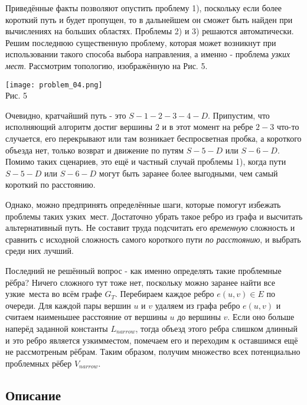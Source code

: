 \documentclass[12pt]{article}
\begin{document}
Приведённые факты позволяют опустить проблему 1), поскольку если более короткий путь и будет пропущен, то в дальнейшем он сможет быть найден при вычислениях на больших областях. Проблемы 2) и 3) решаются автоматически. Решим последнюю существенную проблему, которая может возникнут при использовании такого способа выбора направления, а именно - проблема \textit{узких мест}. Рассмотрим топологию, изображённую на Рис. 5.

\begin{center}
\texttt{[image: problem\_04.png]} \\
    Рис. 5
\end{center}

Очевидно, кратчайший путь - это $S-1-2-3-4-D$. Припустим, что исполняющий алгоритм достиг вершины $2$ и в этот момент на ребре $2-3$ что-то случается, его перекрывают или там возникает беспросветная \glqq пробка\grqq, а короткого объезда нет, только возврат и движение по путям $S-5-D$ или $S-6-D$. Помимо таких сценариев, это ещё и частный случай проблемы 1), когда пути $S-5-D$ или $S-6-D$ могут быть заранее более выгодными, чем самый короткий по расстоянию.

Однако, можно предпринять определённые шаги, которые помогут избежать проблемы таких \glqq узких\grqq \ мест. Достаточно убрать такое ребро из графа и высчитать альтернативный путь. Не составит труда подсчитать его \textit{временную} сложность и сравнить с исходной сложность самого короткого пути \textit{по расстоянию}, и выбрать среди них лучший. 

Последний не решённый вопрос - как именно определять такие проблемные рёбра? Ничего сложного тут тоже нет, поскольку можно заранее найти все \glqq узкие\grqq \ места во всём графе $G_T$. Перебираем каждое ребро $e(u,v) \in E$ по очереди. Для каждой пары вершин $u$ и $v$ удаляем из графа ребро $e(u,v)$ и считаем наименьшее расстояние от вершины $u$ до вершины $v$. Если оно больше наперёд заданной константы $L_{narrow}$, тогда объезд этого ребра слишком длинный и это ребро является \glqq узким\grqq местом, помечаем его и переходим к оставшимся ещё не рассмотреным рёбрам. Таким образом, получим множество всех потенциально проблемных рёбер $V_{narrow}$.  

\subsection{Описание}
\end{document}
